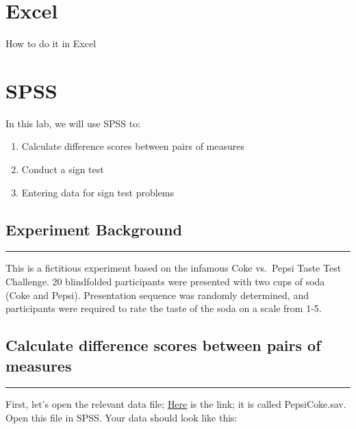 \documentclass[
]{book}
\providecommand{\tightlist}{%
  \setlength{\itemsep}{0pt}\setlength{\parskip}{0pt}}
\begin{document}
\hypertarget{excel-5}{%
\section{Excel}\label{excel-5}}

How to do it in Excel

\hypertarget{spss-5}{%
\section{SPSS}\label{spss-5}}

In this lab, we will use SPSS to:

\begin{enumerate}
\def\labelenumi{\arabic{enumi}.}
\tightlist
\item
  Calculate difference scores between pairs of measures
\item
  Conduct a sign test
\item
  Entering data for sign test problems
\end{enumerate}

\hypertarget{experiment-background}{%
\subsection{Experiment Background}\label{experiment-background}}

\begin{center}\rule{0.5\linewidth}{0.5pt}\end{center}

This is a fictitious experiment based on the infamous Coke vs.~Pepsi Taste Test Challenge. 20 blindfolded participants were presented with two cups of soda (Coke and Pepsi). Presentation sequence was randomly determined, and participants were required to rate the taste of the soda on a scale from 1-5.

\hypertarget{calculate-difference-scores-between-pairs-of-measures}{%
\subsection{Calculate difference scores between pairs of measures}\label{calculate-difference-scores-between-pairs-of-measures}}

\begin{center}\rule{0.5\linewidth}{0.5pt}\end{center}

First, let's open the relevant data file; \href{https://github.com/CrumpLab/statisticsLab/blob/master/data/spssdata/PepsiCoke.sav}{Here} is the link; it is called PepsiCoke.sav. Open this file in SPSS. Your data should look like this:
\end{document}
